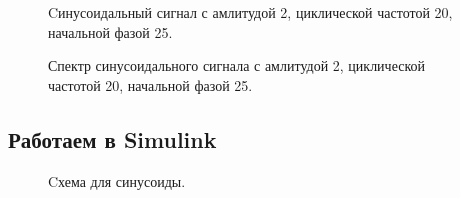 \documentclass[12pt,a4paper]{scrartcl}
\begin{document}
\begin{figure}[h!]
\caption{Cинусоидальный сигнал с амлитудой 2, циклической частотой 20, начальной фазой 25.}
\end{figure}

\begin{figure}[h!]
\caption{Спектр синусоидального сигнала с амлитудой 2, циклической частотой 20, начальной фазой 25.}
\end{figure}

\newpage
\subsection{Работаем в Simulink}
\label{sec:workSim}

\begin{figure}[h!]
\caption{Cхема для синусоиды.}
\end{figure}
\end{document}
